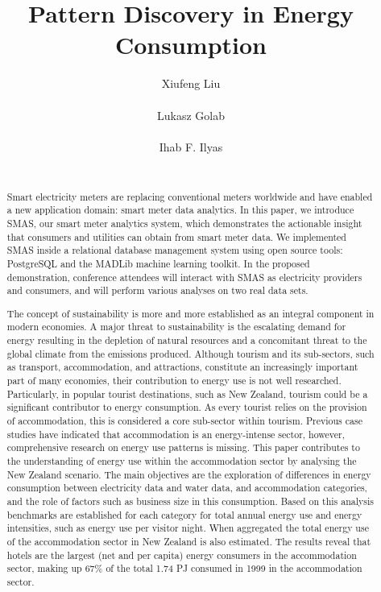 \documentclass{sig-alternate}
\begin{document}
\title{Pattern Discovery in Energy Consumption}

\author{
\alignauthor
Xiufeng Liu \\
\\
\alignauthor 
Lukasz Golab \\
\\
\alignauthor 
Ihab F. Ilyas \\
\\
}
\maketitle

\begin{abstract}
Smart electricity meters are replacing conventional meters worldwide and have enabled a new application domain: smart meter data analytics.  In this paper, we introduce SMAS, our smart meter analytics system, which demonstrates the actionable insight that consumers and utilities can obtain from smart meter data.  We implemented SMAS inside a relational database management system using open source tools: PostgreSQL and the MADLib machine learning toolkit.  In the proposed demonstration, conference attendees will interact with SMAS as electricity providers and consumers, and will perform various analyses on two real data sets.

The concept of sustainability is more and more established as an integral component in modern economies. A
major threat to sustainability is the escalating demand for energy resulting in the depletion of natural resources and a concomitant threat to the global climate from the emissions produced. Although tourism and its sub-sectors, such as transport, accommodation, and attractions, constitute an increasingly important part of many economies, their contribution to energy use is not well researched. Particularly, in popular tourist destinations, such as New Zealand, tourism could be a signiﬁcant contributor to energy consumption. As every tourist relies on the provision of accommodation, this is considered a core sub-sector within tourism. Previous case studies have indicated that accommodation is an energy-intense sector, however, comprehensive research on energy use patterns is missing. This paper contributes to the understanding of energy use within the accommodation sector by analysing the New Zealand scenario. The main objectives are the exploration of differences in energy consumption between electricity data and water data, and  accommodation categories, and the role of factors such as business size in this consumption. Based on this analysis benchmarks are established for each category for total annual energy use and energy intensities, such as energy use per visitor night. When aggregated the total energy use of the accommodation sector in New Zealand is also estimated. The results reveal that hotels are the largest (net and per capita) energy consumers in the accommodation sector, making up 67\% of the total 1.74 PJ consumed in 1999 in the accommodation sector. 
\end{abstract}
\end{document}
